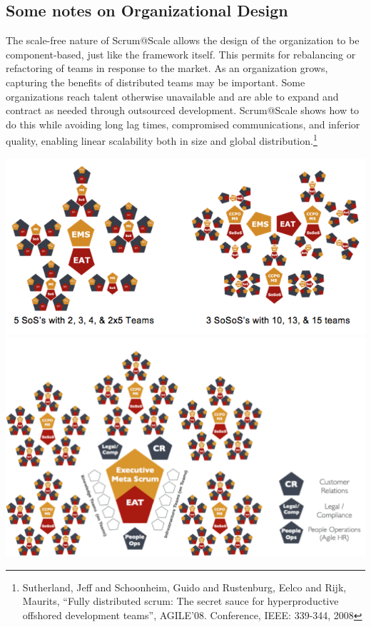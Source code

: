 \documentclass[12pt,a4paper,parskip=full]{scrartcl}
\begin{document}
\subsection{Some notes on Organizational Design}
The scale-free nature of Scrum@Scale allows the design of the organization
to be component-based, just like the framework itself. This permits for
rebalancing or refactoring of teams in response to the market. As an
organization grows, capturing the benefits of distributed teams may be
important. Some organizations reach talent otherwise unavailable and are
able to expand and contract as needed through outsourced development.
Scrum@Scale shows how to do this while avoiding long lag times, compromised
communications, and inferior quality, enabling linear scalability both in
size and global distribution.\footnote{Sutherland, Jeff and Schoonheim,
Guido and Rustenburg, Eelco and Rijk, Maurits, ``Fully distributed scrum:
The secret sauce for hyperproductive offshored development teams'',
AGILE'08. Conference, IEEE: 339-344, 2008}

\includegraphics[width=1.0\linewidth]{VariableSoS-R2.png}
\includegraphics[width=1.0\linewidth]{OrganizationalDiagram.png}
\end{document}
